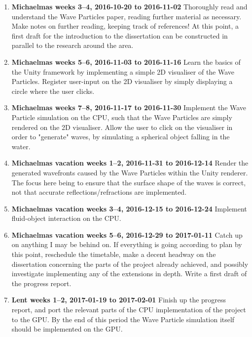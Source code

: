 \begin{enumerate}

\item \textbf{Michaelmas weeks 3--4, 2016-10-20 to 2016-11-02} Thoroughly read
and understand the Wave Particles paper, reading further material as necessary.
Make notes on further reading, keeping track of references! At this point, a
first draft for the introduction to the dissertation can be constructed in
parallel to the research around the area.

\item \textbf{Michaelmas weeks 5--6, 2016-11-03 to 2016-11-16} Learn the basics
of the Unity framework by implementing a simple 2D visualiser of the Wave
Particles. Register user-input on the 2D visualiser by simply displaying a
circle where the user clicks.

\item \textbf{Michaelmas weeks 7--8, 2016-11-17 to 2016-11-30} Implement the
Wave Particle simulation on the CPU, such that the Wave Particles are simply
rendered on the 2D visualiser. Allow the user to click on the visualiser in
order to "generate" waves, by simulating a spherical object falling in the
water.

\item \textbf{Michaelmas vacation weeks 1--2, 2016-11-31 to 2016-12-14} Render
the generated wavefronts caused by the Wave Particles within the Unity renderer.
The focus here being to ensure that the surface shape of the waves is correct,
not that accurate reflections/refractions are implemented.

\item \textbf{Michaelmas vacation weeks 3--4, 2016-12-15 to 2016-12-24}
Implement fluid-object interaction on the CPU.

\item \textbf{Michaelmas vacation weeks 5--6, 2016-12-29 to 2017-01-11} Catch up
on anything I may be behind on. If everything is going according to plan by this
point, reschedule the timetable, make a decent headway on the dissertation
concerning the parts of the project already achieved, and possibly investigate
implementing any of the extensions in depth. Write a first draft of the progress
report.

\item \textbf{Lent weeks 1--2, 2017-01-19 to 2017-02-01} Finish up the progress
report, and port the relevant parts of the CPU implementation of the project to
the GPU. By the end of this period the Wave Particle simulation itself should be
implemented on the GPU.


\end{enumerate}
